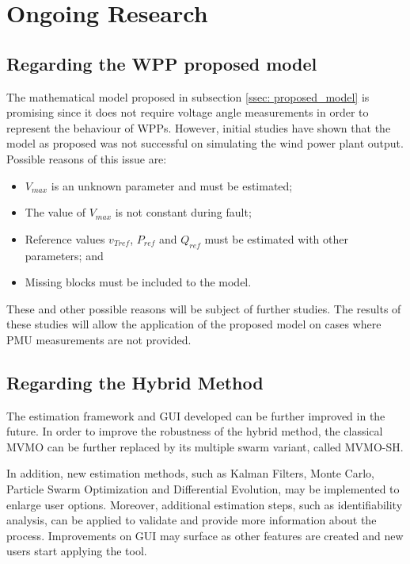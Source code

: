 \chapter{Ongoing Research}
\label{ch: Ongoing}

\section{Regarding the WPP proposed model}

The mathematical model proposed in subsection \ref{ssec: proposed_model} is promising since it does not require voltage angle measurements in order to represent the behaviour of WPPs. However, initial studies have shown that the model as proposed was not successful on simulating the wind power plant output. Possible reasons of this issue are:

\begin{itemize}
	\item $V_{max}$ is an unknown parameter and must be estimated;
	\item The value of $V_{max}$ is not constant during fault;
	\item Reference values $v_{Tref}$, $P_{ref}$ and $Q_{ref}$ must be estimated with other parameters; and
	\item Missing blocks must be included to the model.
\end{itemize}

These and other possible reasons will be subject of further studies. The results of these studies will allow the application of the proposed model on cases where PMU measurements are not provided.

\section{Regarding the Hybrid Method}

The estimation framework and GUI developed can be further improved in the future. In order to improve the robustness of the hybrid method, the classical MVMO can be further replaced by its multiple swarm variant, called MVMO-SH.

In addition, new estimation methods, such as Kalman Filters, Monte Carlo, Particle Swarm Optimization and Differential Evolution, may be implemented to enlarge user options. Moreover, additional estimation steps, such as identifiability analysis, can be applied to validate and provide more information about the process. Improvements on GUI may surface as other features are created and new users start applying the tool.